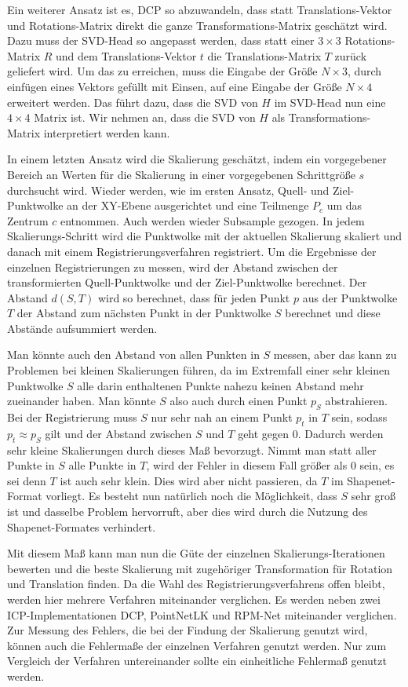 \documentclass[12pt,titlepage, twoside]{article}
\begin{document}
Ein weiterer Ansatz ist es, DCP so abzuwandeln, dass statt Translations-Vektor und Rotations-Matrix direkt die ganze Transformations-Matrix geschätzt wird. 
Dazu muss der SVD-Head so angepasst werden, dass statt einer $3\times 3$ Rotations-Matrix $R$ und dem Translations-Vektor $t$ die Translations-Matrix $T$ zurück geliefert wird.
Um das zu erreichen, muss die Eingabe der Größe $N\times 3$, durch einfügen eines Vektors gefüllt mit Einsen, auf eine Eingabe der Größe $N\times 4$ erweitert werden. 
Das führt dazu, dass die SVD von $H$ im SVD-Head nun eine $4\times 4$ Matrix ist. 
Wir nehmen an, dass die SVD von $H$ als Transformations-Matrix interpretiert werden kann.

In einem letzten Ansatz wird die Skalierung geschätzt, indem ein vorgegebener Bereich an Werten für die Skalierung in einer vorgegebenen Schrittgröße $s$ durchsucht wird.
Wieder werden, wie im ersten Ansatz, Quell- und Ziel-Punktwolke an der XY-Ebene ausgerichtet und eine Teilmenge $P_c$ um das Zentrum $c$ entnommen. Auch werden wieder Subsample gezogen.
In jedem Skalierungs-Schritt wird die Punktwolke mit der aktuellen Skalierung skaliert und danach mit einem Registrierungsverfahren registriert.
Um die Ergebnisse der einzelnen Registrierungen zu messen, wird der Abstand zwischen der transformierten Quell-Punktwolke und der Ziel-Punktwolke berechnet. 
Der Abstand $d(S,T)$ wird so berechnet, dass für jeden Punkt $p$ aus der Punktwolke $T$ der Abstand zum nächsten Punkt in der Punktwolke $S$ berechnet und diese Abstände aufsummiert werden.

Man könnte auch den Abstand von allen Punkten in $S$ messen, aber das kann zu Problemen bei kleinen Skalierungen führen, 
da im Extremfall einer sehr kleinen Punktwolke $S$ alle darin enthaltenen Punkte nahezu keinen Abstand mehr zueinander haben.
Man könnte $S$ also auch durch einen Punkt $p_{S}$ abstrahieren.
Bei der Registrierung muss $S$ nur sehr nah an einem Punkt $p_t$ in $T$ sein, sodass $p_t \approx p_S$ gilt und der Abstand zwischen $S$ und $T$ geht gegen $0$. 
Dadurch werden sehr kleine Skalierungen durch dieses Maß bevorzugt.
Nimmt man statt aller Punkte in $S$ alle Punkte in $T$, wird der Fehler in diesem Fall größer als $0$ sein, es sei denn $T$ ist auch sehr klein.
Dies wird aber nicht passieren, da $T$ im Shapenet-Format vorliegt.
Es besteht nun natürlich noch die Möglichkeit, dass $S$ sehr groß ist und dasselbe Problem hervorruft, aber dies wird durch die Nutzung des Shapenet-Formates verhindert.

Mit diesem Maß kann man nun die Güte der einzelnen Skalierungs-Iterationen bewerten und die beste Skalierung mit zugehöriger Transformation für Rotation und Translation finden.
Da die Wahl des Registrierungsverfahrens offen bleibt, werden hier mehrere Verfahren miteinander verglichen. Es werden neben zwei ICP-Implementationen DCP, PointNetLK und RPM-Net miteinander verglichen.
Zur Messung des Fehlers, die bei der Findung der Skalierung genutzt wird, können auch die Fehlermaße der einzelnen Verfahren genutzt werden. 
Nur zum Vergleich der Verfahren untereinander sollte ein einheitliche Fehlermaß genutzt werden.
\end{document}
